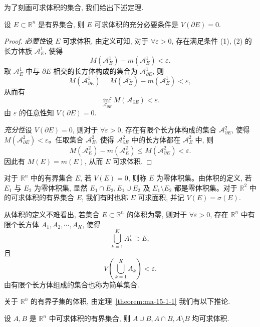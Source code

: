 为了刻画可求体积的集合, 我们给出下述定理.

\begin{theorem}\label{theorem:ma-15-1-1}
设 $E\subset\mathbb R^n$ 是有界集合, 则 $E$ 可求体积的充分必要条件是 $V(\partial E)=0$.
\end{theorem}


\begin{proof}
\emph{必要性}\quad 设 $E$ 可求体积, 由定义可知, 对于 $\forall\varepsilon>0$, 存在满足条件 (1), (2) 的长方体族 $\mathcal A_E^1$, 使得
\[
  M(\mathcal A_E^1)-m(\mathcal A_E^1)<\varepsilon.
\]
取 $\mathcal A_E^1$ 中与 $\partial E$ 相交的长方体构成的集合为 $\mathcal A_{\partial E}^1$, 则
\[
  M(\mathcal A_{\partial E}^1)=M(\mathcal A_E^1)-m(\mathcal A_E^1)<\varepsilon,
\]
从而有
\[
  \inf_{\mathcal A_{\partial E}}M(\mathcal A_{\partial E})<\varepsilon.
\]
由 $\varepsilon$ 的任意性知 $V(\partial E)=0$.

\emph{充分性}\quad 设 $V(\partial E)=0$, 则对于 $\forall\varepsilon>0$, 存在有限个长方体构成的集合 $\mathcal A_{\partial E}^2$, 使得 $M(\mathcal A_{\partial E}^2)<\varepsilon$。任取集合 $\mathcal A_E^2$, 使得 $\mathcal A_{\partial E}^2$ 中的长方体都在 $\mathcal A_E^2$ 中, 则
\[
  M(\mathcal A_E^2)-m(\mathcal A_E^2)\leqslant M(\mathcal A_{\partial E}^2)<\varepsilon.
\]
因此有 $M(E)=m(E)$, 从而 $E$ 可求体积.
\end{proof}


对于 $\mathbb R^n$ 中的有界集合 $E$, 若 $V(E)=0$, 则称 $E$ 为零体积集。由体积的定义, 若 $E_1$ 与 $E_2$ 为零体积集, 显然 $E_1\cap E_2,E_1\cup E_2$ 及 $E_1\setminus E_2$ 都是零体积集。对于 $\mathbb R^2$ 中的可求体积的有界集合 $E$, 我们有时也称 $E$ 可求面积, 并记 $V(E)=\sigma(E)$.

\begin{remark}\label{remark:ma-15-source-4}
从体积的定义不难看出, 若集合 $E\subset\mathbb R^n$ 的体积为零, 则对于 $\forall\varepsilon>0$, 存在 $\mathbb R^n$ 中有限个长方体 $A_1,A_2,\cdots,A_K$, 使得
\[
  \bigcup_{k=1}^K A_k^\circ\supset E,
\]
且
\[
  V\left(\bigcup_{k=1}^K A_k\right)<\varepsilon.
\]
由有限个长方体组成的集合也称为简单集合.
\end{remark}

关于 $\mathbb R^n$ 的有界子集的体积, 由定理~\ref{theorem:ma-15-1-1} 我们有以下推论.

\begin{corollary}\label{corollary:ma-local-15.1-1}
设 $A,B$ 是 $\mathbb R^n$ 中可求体积的有界集合, 则 $A\cup B,A\cap B,A\setminus B$ 均可求体积.
\end{corollary}


